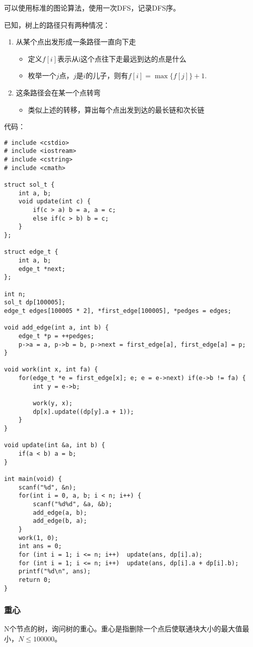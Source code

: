 可以使用标准的图论算法，使用一次DFS，记录DFS序。

已知，树上的路径只有两种情况：
\begin{enumerate}
    \item{从某个点出发形成一条路径一直向下走}
    \begin{itemize}
        \item{定义$f[i]$表示从i这个点往下走最远到达的点是什么}
        \item{枚举一个$j$点，$j$是$i$的儿子，则有$f[i]=\max\{f[j]\}+1$}.
    \end{itemize}
    \item{这条路径会在某一个点转弯}
    \begin{itemize}
        \item{类似上述的转移，算出每个点出发到达的最长链和次长链}
    \end{itemize}
\end{enumerate}
代码：
\begin{verbatim}
# include <cstdio>
# include <iostream>
# include <cstring>
# include <cmath>

struct sol_t {
    int a, b;
    void update(int c) {
        if(c > a) b = a, a = c;
        else if(c > b) b = c;
    }
};

struct edge_t {
    int a, b;
    edge_t *next;
};

int n;
sol_t dp[100005];
edge_t edges[100005 * 2], *first_edge[100005], *pedges = edges;

void add_edge(int a, int b) {
    edge_t *p = ++pedges;
    p->a = a, p->b = b, p->next = first_edge[a], first_edge[a] = p;
}

void work(int x, int fa) {
    for(edge_t *e = first_edge[x]; e; e = e->next) if(e->b != fa) {
        int y = e->b;

        work(y, x);
        dp[x].update((dp[y].a + 1));
    }
}

void update(int &a, int b) {
    if(a < b) a = b;
}

int main(void) {
    scanf("%d", &n);
    for(int i = 0, a, b; i < n; i++) {
        scanf("%d%d", &a, &b);
        add_edge(a, b);
        add_edge(b, a);
    }
    work(1, 0);
    int ans = 0;
    for (int i = 1; i <= n; i++)  update(ans, dp[i].a);
    for (int i = 1; i <= n; i++)  update(ans, dp[i].a + dp[i].b);
    printf("%d\n", ans);
    return 0;
}
\end{verbatim}

\subsubsection{重心}
N个节点的树，询问树的重心。重心是指删除一个点后使联通块大小的最大值最小，$N\le 100000$。

